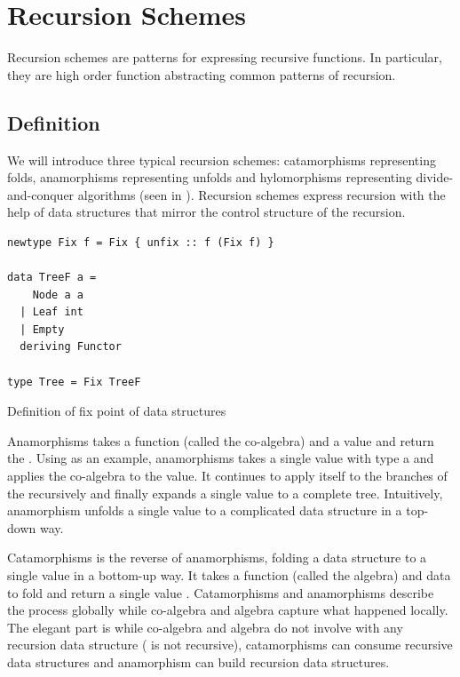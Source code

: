 \section{Recursion Schemes} \label{b:rs}
Recursion schemes are patterns for expressing recursive functions. In particular, they are high order function abstracting common patterns of recursion.
\subsection{Definition}
We will introduce three typical recursion schemes: catamorphisms representing folds, anamorphisms representing unfolds and hylomorphisms representing divide-and-con\-quer algorithms (seen in ). Recursion schemes express recursion with the help of data structures that mirror the control structure of the recursion.

\begin{listing}[ht]
\begin{verbatim}
newtype Fix f = Fix { unfix :: f (Fix f) }

data TreeF a =
    Node a a
  | Leaf int
  | Empty
  deriving Functor

type Tree = Fix TreeF
\end{verbatim}
\caption{Definition of fix point of data structures} \label{p:pal:c2}
\end{listing}

Anamorphisms takes a function  (called the co-algebra) and a value  and return the . Using  as an example, anamorphisms takes a single value with type a and applies the co-algebra to the value. It continues to apply itself to the branches of the  recursively and finally expands a single value to a complete tree. Intuitively, anamorphism unfolds a single value to a complicated data structure in a top-down way.

Catamorphisms is the reverse of anamorphisms, folding a data structure to a single value in a bottom-up way. It takes a function  (called the algebra) and data  to fold and return a single value . Catamorphisms and anamorphisms describe the process globally while co-algebra and algebra capture what happened locally. The elegant part is while co-algebra and algebra do not involve with any recursion data structure ( is not recursive), catamorphisms can consume recursive data structures and anamorphism can build recursion data structures.


